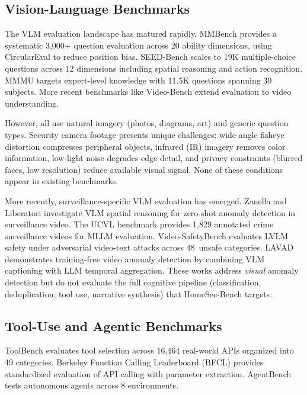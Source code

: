 \documentclass[onecolumn,10pt]{IEEEtran}
\begin{document}
\subsection{Vision-Language Benchmarks}
The VLM evaluation landscape has matured rapidly. MMBench
\cite{liu2023mmbench} provides a systematic 3,000+ question evaluation
across 20 ability dimensions, using CircularEval to reduce position bias.
SEED-Bench \cite{li2023seedbench} scales to 19K multiple-choice questions
across 12 dimensions including spatial reasoning and action recognition.
MMMU \cite{yue2024mmmu} targets expert-level knowledge with 11.5K
questions spanning 30 subjects. More recent benchmarks like Video-Bench
\cite{ning2023videobench} extend evaluation to video understanding.

However, all use natural imagery (photos, diagrams, art) and generic
question types. Security camera footage presents unique challenges:
wide-angle fisheye distortion compresses peripheral objects, infrared
(IR) imagery removes color information, low-light noise degrades edge
detail, and privacy constraints (blurred faces, low resolution) reduce
available visual signal. None of these conditions appear in existing
benchmarks.

More recently, surveillance-specific VLM evaluation has emerged.
Zanella and Liberatori \cite{zanella2024vlmsurveillance} investigate
VLM spatial reasoning for zero-shot anomaly detection in surveillance
video. The UCVL benchmark \cite{wu2024ucvl} provides 1,829 annotated
crime surveillance videos for MLLM evaluation. Video-SafetyBench
\cite{yuan2024videosafety} evaluates LVLM safety under adversarial
video-text attacks across 48~unsafe categories. LAVAD
\cite{zanella2024lavad} demonstrates training-free video anomaly
detection by combining VLM captioning with LLM temporal aggregation.
These works address \emph{visual} anomaly detection but do not
evaluate the full cognitive pipeline (classification, deduplication,
tool use, narrative synthesis) that HomeSec-Bench targets.

\subsection{Tool-Use and Agentic Benchmarks}
ToolBench \cite{qin2023toolllm} evaluates tool selection across 16,464
real-world APIs organized into 49 categories. Berkeley Function Calling
Leaderboard (BFCL) \cite{berkeley2024bfcl} provides standardized
evaluation of API calling with parameter extraction. AgentBench
\cite{liu2023agentbench} tests autonomous agents across 8 environments.
\end{document}
